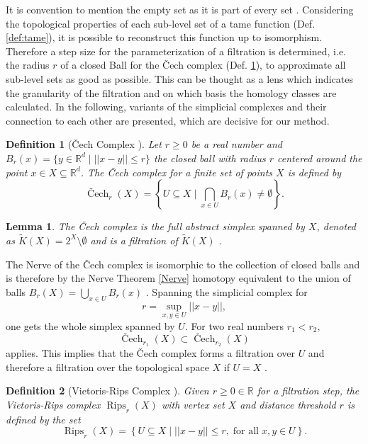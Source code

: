 \documentclass[journal]{IEEEtran}
\DeclareMathOperator{\Cech}{\text{\v{C}ech}}
\DeclareMathOperator{\Rips}{Rips}
\newtheorem{definition}{Definition}[section]
\newtheorem{lemma}{Lemma}[definition]
\begin{document}
It is convention to mention the empty set as it is part of every set \cite{ChazalGLM15}.
Considering the topological properties of each sub-level set of a tame function (Def. \ref{def:tame}), it is possible to reconstruct this function up to isomorphism. Therefore a step size for the parameterization of a filtration is determined, i.e. the radius $r$ of a closed Ball for the \v{C}ech complex (Def. \ref{def:cech}), to approximate all sub-level sets as good as possible. This can be thought as a lens which indicates the granularity of the filtration and on which basis the homology classes are calculated. In the following, variants of the simplicial complexes and their connection to each other are presented, which are decisive for our method.

\begin{definition}[\v{C}ech Complex \cite{BauerE14}]
\label{def:cech}
Let $r \geq 0$ be a real number and $B_r(x) = \{y \in \mathbb{R}^d \; | \; ||x-y|| \leq r\}$ the closed ball with radius $r$ centered around the point $x \in X \subseteq \mathbb{R}^d$. The \v{C}ech complex for a finite set of points $X$ is defined by
\begin{equation}
  \Cech_r(X) = \left\{ U \subseteq X  \; \bigg\rvert \; \bigcap_{x\in U}B_r(x) \neq \emptyset \right\}.
\end{equation}
\end{definition}

\begin{lemma}
The \v{C}ech complex is the full abstract simplex spanned by $X$, denoted as $\tilde{K}(X) = 2^{X}\setminus \emptyset$ and is a filtration of $\tilde{K}(X)$  \cite{BauerE14}.
\end{lemma}

\begin{IEEEproof} The Nerve of the \v{C}ech complex is isomorphic to the collection of closed balls and is therefore by the Nerve Theorem \ref{Nerve} homotopy equivalent to the union of balls $B_r(X) = \bigcup_{x \in U} B_r(x)$ \cite{borsuk}. Spanning the simplicial complex for
\[
r = \sup_{x,y \in U} ||x-y||,
\] one gets the whole simplex spanned by $U$. For two real numbers $r_1 < r_2$,
\[
\Cech_{r_1}(X) \subset \Cech_{r_2}(X)
\] applies. This implies that the \v{C}ech complex forms a filtration over $U$ and therefore a filtration over the topological space $X$ if $U = X$ \cite{BauerE14}.
\end{IEEEproof}


\begin{definition}[Vietoris-Rips Complex \cite{boissonnat2018geometric}]
Given $r \geq 0 \in \mathbb{R}$ for a filtration step, the Vietoris-Rips complex $\Rips_r(X)$ with vertex set $X$ and distance threshold $r$ is defined by the set
\begin{equation}
\Rips_r(X) = \left\{ U \subseteq X \; \bigg\rvert \; ||x-y|| \leq r, \; \text{for all} \; x,y \in U \right\}.
\end{equation}
\end{definition}
\end{document}
